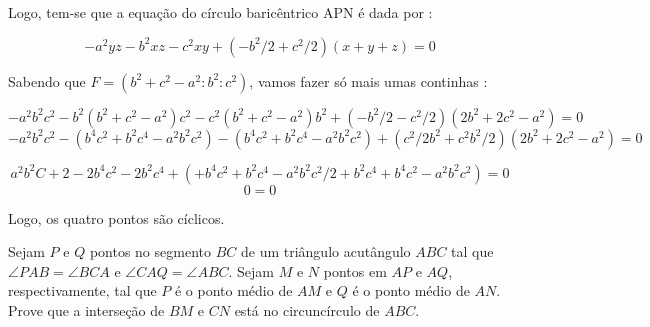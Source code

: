 \documentclass{article}
\begin{document}
Logo, tem-se que a equação do círculo baricêntrico APN é dada por :

$$
-a^2yz - b^2xz - c^2xy + (-b^2/2 + c^2/2)(x+y+z) = 0
$$

Sabendo que $F =  (b^2+c^2-a^2 : b^2 : c^2)$, vamos fazer só mais umas continhas : 

$$
-a^2b^2c^2 - b^2(b^2+c^2-a^2)c^2 - c^2(b^2+c^2-a^2)b^2 + (-b^2/2 - c^2/2)(2b^2+2c^2-a^2) = 0
$$
$$
-a^2b^2c^2 - (b^4c^2 + b^2c^4 - a^2b^2c^2) - (b^4c^2 + b^2c^4 - a^2b^2c^2) + (c^2/2b^2 + c^2b^2/2)(2b^2+2c^2-a^2) = 0
$$

$$
a^2b^2C+2 - 2b^4c^2 - 2b^2c^4 + (+b^4c^2 + b^2c^4 - a^2b^2c^2/2 + b^2c^4 + b^4c^2 - a^2b^2c^2) = 0
$$
$$
0 = 0
$$

Logo, os quatro pontos são cíclicos.
\begin{tcolorbox}[colback=purple!5!white,colframe=purple!75!black,title=Problema para aprender\emoji{goblin}]
Sejam $P$ e $Q$ pontos no segmento $BC$ de um triângulo acutângulo $ABC$ tal que $\angle PAB=\angle BCA$ e $\angle CAQ=\angle ABC$. Sejam $M$ e $N$ pontos em $AP$ e $AQ$, respectivamente, tal que $P$ é o ponto médio de $AM$ e $Q$ é o ponto médio de $AN$. Prove que a interseção de $BM$ e $CN$ está no circuncírculo de $ABC$.
\end{tcolorbox}
\end{document}

